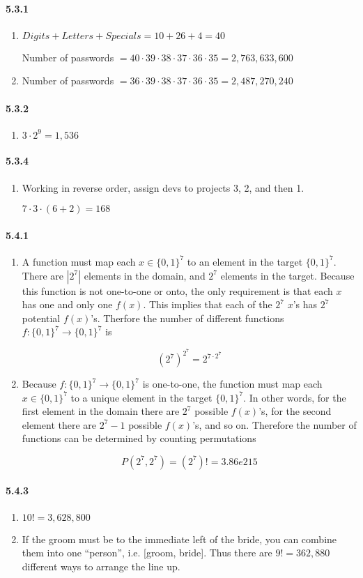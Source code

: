 \documentclass[11pt, letterpaper, twocolumn, fleqn]{article}
\begin{document}
\paragraph{5.3.1}
\begin{enumerate}
  \item $Digits + Letters + Specials = 10 + 26 + 4 = 40$
        
  Number of passwords $= 40 \cdot 39 \cdot 38 \cdot 37 \cdot 36 \cdot 35 = 2,763,633,600$
  \item Number of passwords $= 36 \cdot 39 \cdot 38 \cdot 37 \cdot 36 \cdot 35 = 2,487,270,240$
\end{enumerate}

\paragraph{5.3.2}
\begin{enumerate}
  \item $3 \cdot 2^9 = 1,536$
\end{enumerate}

\paragraph{5.3.4}
\begin{enumerate}
  \item Working in reverse order, assign devs to projects 3, 2, and then 1.
  
  $7 \cdot 3 \cdot (6+2) = 168$
\end{enumerate}

\paragraph{5.4.1}
\begin{enumerate}
  \item A function must map each $x \in \{0,1\}^7$ to an element in the target $\{0,1\}^7$. There are $|2^7|$ elements in the domain, and $2^7$ elements in the target. Because this function is not one-to-one or onto, the only requirement is that each $x$ has one and only one $f(x)$. This implies that each of the $2^7$ $x$'s has $2^7$ potential $f(x)$'s. Therfore the number of different functions $f:\{0,1\}^7 \rightarrow \{0,1\}^7$ is 
  
    $$ \left(2^7 \right)^{2^7} = 2^{7 \cdot 2^7}$$
    
  \item Because $f:\{0,1\}^7 \rightarrow \{0,1\}^7$ is one-to-one, the function must map each $x \in \{0,1\}^7$ to a unique element in the target $\{0,1\}^7$. In other words, for the first element in the domain there are $2^7$ possible $f(x)$'s, for the second element there are $2^7 -1$ possible $f(x)$'s, and so on. Therefore the number of functions can be determined by counting permutations 
  
    $$ P(2^7,2^7) = (2^7)! = 3.86e215$$
\end{enumerate}

\paragraph{5.4.3}
\begin{enumerate}
  \item $10! = 3,628,800$
  \item If the groom must be to the immediate left of the bride, you can combine them into one ``person'', i.e. [groom, bride]. Thus there are $9! = 362,880$ different ways to arrange the line up.
\end{enumerate}
\end{document}
